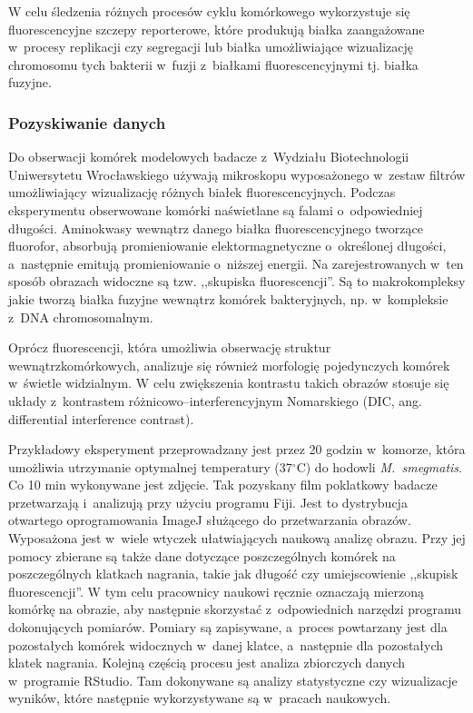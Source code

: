 \documentclass[declaration,shortabstract,mgr]{iithesis}
\begin{document}
W celu śledzenia różnych procesów cyklu komórkowego wykorzystuje się fluorescencyjne szczepy reporterowe, które produkują białka zaangażowane w~procesy replikacji czy segregacji lub białka umożliwiające wizualizację chromosomu tych bakterii w~fuzji z~białkami fluorescencyjnymi tj. białka fuzyjne.

\subsubsection{Pozyskiwanie danych}

Do obserwacji komórek modelowych badacze z~Wydziału Biotechnologii Uniwersytetu Wrocławskiego używają mikroskopu wyposażonego w~zestaw filtrów umożliwiający wizualizację różnych białek fluorescencyjnych.
Podczas eksperymentu obserwowane komórki naświetlane są falami o~odpowiedniej długości.
Aminokwasy wewnątrz danego białka fluorescencyjnego tworzące fluorofor, absorbują promieniowanie elektormagnetyczne o~określonej długości, a~następnie emitują promieniowanie o~niższej energii.
Na zarejestrowanych w~ten sposób obrazach widoczne są tzw. ,,skupiska fluorescencji''.
Są to makrokompleksy jakie tworzą białka fuzyjne wewnątrz komórek bakteryjnych, np. w~kompleksie z~DNA chromosomalnym.

Oprócz fluorescencji, która umożliwia obserwację struktur wewnątrzkomórkowych, analizuje się również morfologię pojedynczych komórek w~świetle widzialnym.
W celu zwiększenia kontrastu takich obrazów stosuje się układy z~kontrastem różnicowo--interferencyjnym Nomarskiego\cite{paper:dic} (DIC, ang. differential interference contrast).

Przykładowy eksperyment przeprowadzany jest przez 20 godzin w~komorze, która umożliwia utrzymanie optymalnej temperatury (37$^{\circ}$C) do hodowli \emph{M.~smegmatis}.
Co 10 min wykonywane jest zdjęcie.
Tak pozyskany film poklatkowy badacze przetwarzają i~analizują przy użyciu programu Fiji\cite{imagej:fiji}.
Jest to dystrybucja otwartego oprogramowania ImageJ służącego do przetwarzania obrazów.
Wyposażona jest w~wiele wtyczek ułatwiających naukową analizę obrazu.
Przy jej pomocy zbierane są także dane dotyczące poszczególnych komórek na poszczególnych klatkach nagrania, takie jak długość czy umiejscowienie ,,skupisk fluorescencji''.
W tym celu pracownicy naukowi ręcznie oznaczają mierzoną komórkę na obrazie, aby następnie skorzystać z~odpowiednich narzędzi programu dokonujących pomiarów.
Pomiary są zapisywane, a~proces powtarzany jest dla pozostałych komórek widocznych w~danej klatce, a~następnie dla pozostałych klatek nagrania.
Kolejną częścią procesu jest analiza zbiorczych danych w~programie RStudio\cite{app:rstudio}.
Tam dokonywane są analizy statystyczne czy wizualizacje wyników, które następnie wykorzystywane są w~pracach naukowych.
\end{document}
